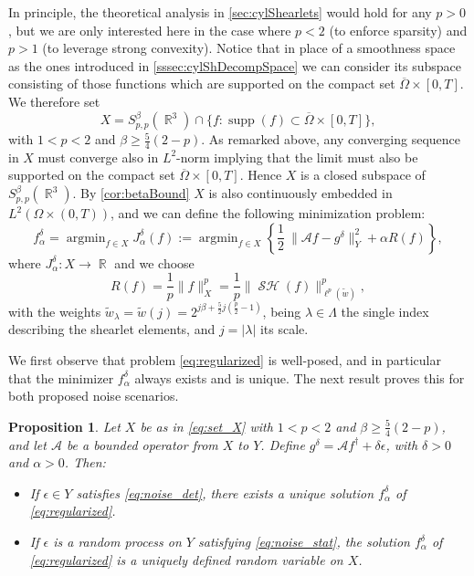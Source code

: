 \documentclass[11pt,a4paper]{article}
\numberwithin{equation}{section}
\newtheorem{proposition}[theorem]{Proposition}
\DeclareMathOperator{\R}{\mathbb{R}}
\DeclareMathOperator{\supp}{supp}
\DeclareMathOperator*{\argmin}{argmin}
\DeclareMathOperator{\sh}{\mathcal{SH}}
\newcommand{\cA}{\mathscr{A}}
\def\fda{f^\delta_{\alpha}}
\def\Jda{J^\delta_{\alpha}}
\def\gd{{g}^{\delta}}
\begin{document}
In principle, the theoretical analysis in \cref{sec:cylShearlets} would hold for any $p>0$, but we are only interested here in the case where $p<2$ (to enforce sparsity) and $p>1$ (to leverage strong convexity).
Notice that in place of a smoothness space as the ones introduced in \cref{sssec:cylShDecompSpace} we can consider its subspace consisting of those functions which are supported on the compact set $\overline{\Omega}\times [0,T]$. 
We therefore set
\begin{equation}
    X = S_{p,p}^\beta(\R^3) \cap \lbrace  f: \supp(f) \subset \overline{\Omega} \times [0, T] \rbrace, \label{eq:set_X}
\end{equation}
with $1<p<2$ and $\beta \geq \frac{5}{4}(2-p)$. 
As remarked above, any converging sequence in $X$ must converge also in $L^2$-norm implying that the limit must also be supported on the compact set $\overline{\Omega}\times [0,T]$. Hence $X$ is a closed subspace of $S_{p,p}^\beta (\R^3)$.
By \cref{cor:betaBound} $X$ is also continuously embedded in $L^2(\Omega \times (0,T))$, 
and we can define the following minimization problem:
\begin{equation}
    \fda = \argmin_{f\in X} \Jda(f) := \argmin_{f \in X} \left\{
\frac{1}{2} \ \| \cA f 
    - \gd\|^2_{Y} + \alpha R(f)
\right\},
\label{eq:regularized}
\end{equation}
where $\Jda \colon X \rightarrow \R$ and we choose 
\begin{equation}
    R(f) = \frac{1}{p} \| f \|_X^p = \frac{1}{p} \| \sh  (f) \|^p_{\ell^p(\tilde{w})},
\label{eq:R_pnorm}
\end{equation}
with the weights $\tilde{w}_\lambda = \tilde{w}(j) = 2^{j\beta + \frac{5}{2} j\left( \frac{p}{2}-1\right)}$, being $\lambda \in \Lambda$ the single index describing the shearlet elements, and $j=|\lambda|$ its scale.

We first observe that problem \eqref{eq:regularized} is well-posed, and in particular that the minimizer $\fda$ always exists and is unique. The next result proves this for both proposed noise scenarios.
\begin{proposition}\label{prop:well-posed-regu}
Let $X$ be as in \eqref{eq:set_X} with $1<p<2$ and $\beta \geq \frac{5}{4}(2-p)$, and let $\cA$ be a bounded operator from $X$ to $Y$. Define $\gd = \cA f^\dag + \delta \epsilon$, with $\delta >0$ and $\alpha > 0$. Then:
\begin{itemize}
    \item If $\epsilon \in Y$ satisfies \eqref{eq:noise_det}, there exists a unique solution $\fda$ of \eqref{eq:regularized}.
    \item If $\epsilon$ is a random process on $Y$ satisfying \eqref{eq:noise_stat}, the solution $\fda$ of \eqref{eq:regularized} is a uniquely defined random variable on $X$.
\end{itemize} 
\end{proposition}
\end{document}
